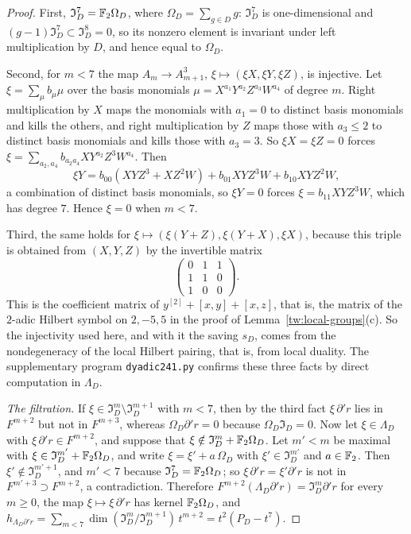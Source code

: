 \begin{proof}
First, $\mathfrak I_D^7=\mathbb F_2\Omega_D$, where $\Omega_D=\sum_{g\in D}g$:
$\mathfrak I_D^7$ is one-dimensional and $(g-1)\mathfrak I_D^7\subset\mathfrak I_D^8=0$,
so its nonzero element is invariant under left multiplication by $D$, and
hence equal to $\Omega_D$.

Second, for $m<7$ the map $A_m\to A_{m+1}^3$, $\xi\mapsto(\xi X,\xi Y,\xi Z)$,
is injective. Let $\xi=\sum_\mu b_\mu\mu$ over the basis monomials
$\mu=X^{a_1}Y^{a_2}Z^{a_3}W^{a_4}$ of degree $m$. Right multiplication by $X$
maps the monomials with $a_1=0$ to distinct basis monomials and kills the
others, and right multiplication by $Z$ maps those with $a_3\le2$ to
distinct basis monomials and kills those with $a_3=3$. So $\xi X=\xi Z=0$
forces $\xi=\sum_{a_2,a_4}b_{a_2a_4}XY^{a_2}Z^3W^{a_4}$. Then
\[
 \xi Y=b_{00}(XYZ^3+XZ^2W)+b_{01}XYZ^3W+b_{10}XYZ^2W,
\]
a combination of distinct basis monomials, so $\xi Y=0$ forces
$\xi=b_{11}XYZ^3W$, which has degree $7$. Hence $\xi=0$ when $m<7$.

Third, the same holds for $\xi\mapsto(\xi(Y+Z),\xi(Y+X),\xi X)$, because this
triple is obtained from $(X,Y,Z)$ by the invertible matrix
\[
 \begin{pmatrix}0&1&1\\1&1&0\\1&0&0\end{pmatrix}.
\]
This is the coefficient matrix of $y^{[2]}+[x,y]+[x,z]$, that is, the matrix
of the $2$-adic Hilbert symbol on $2,-5,5$ in the proof of
Lemma~\ref{tw:local-groups}(c). So the injectivity used here, and with it
the saving $s_D$, comes from the nondegeneracy of the local Hilbert pairing,
that is, from local duality. The supplementary program \texttt{dyadic241.py}
confirms these three facts by direct computation in $\Lambda_D$.

\emph{The filtration.} If $\xi\in\mathfrak I_D^m\setminus\mathfrak I_D^{m+1}$
with $m<7$, then by the third fact $\xi\,\partial'r$ lies in $F^{m+2}$ but not
in $F^{m+3}$, whereas $\Omega_D\partial'r=0$ because $\Omega_D\mathfrak I_D=0$.
Now let $\xi\in\Lambda_D$ with $\xi\,\partial'r\in F^{m+2}$, and suppose that
$\xi\notin\mathfrak I_D^m+\mathbb F_2\Omega_D$. Let $m'<m$ be maximal with
$\xi\in\mathfrak I_D^{m'}+\mathbb F_2\Omega_D$, and write $\xi=\xi'+a\,\Omega_D$
with $\xi'\in\mathfrak I_D^{m'}$ and $a\in\mathbb F_2$. Then
$\xi'\notin\mathfrak I_D^{m'+1}$, and $m'<7$ because
$\mathfrak I_D^7=\mathbb F_2\Omega_D$; so $\xi\,\partial'r=\xi'\partial'r$ is not in
$F^{m'+3}\supset F^{m+2}$, a contradiction. Therefore
$F^{m+2}(\Lambda_D\partial'r)=\mathfrak I_D^m\partial'r$ for every $m\ge0$,
the map $\xi\mapsto\xi\,\partial'r$ has kernel $\mathbb F_2\Omega_D$, and
$h_{\Lambda_D\partial'r}=\sum_{m<7}\dim(\mathfrak I_D^m/\mathfrak I_D^{m+1})\,t^{m+2}=t^2(P_D-t^7)$.
\end{proof}

